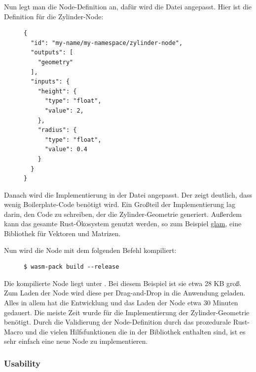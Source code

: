 \documentclass[ngerman]{article}
\begin{document}
Nun legt man die Node-Definition an, dafür wird die Datei  angepasst. Hier ist die Definition für die Zylinder-Node:


\begin{figure}[htbp]
  \begin{code}
    \begin{verbatim}
{
  "id": "my-name/my-namespace/zylinder-node",
  "outputs": [
    "geometry"
  ],
  "inputs": {
    "height": {
      "type": "float",
      "value": 2,
    },
    "radius": {
      "type": "float",
      "value": 0.4
    }
  }
}
    \end{verbatim}
  \end{code}
\end{figure}

Danach wird die Implementierung in der Datei  angepasst. Der  zeigt deutlich, dass wenig Boilerplate-Code benötigt wird. Ein Großteil der Implementierung lag darin, den Code zu schreiben, der die Zylinder-Geometrie generiert.  Außerdem kann das gesamte Rust-Ökosystem genutzt werden, so zum Beispiel \href{https://docs.rs/glam/latest/glam}{glam}, eine Bibliothek für Vektoren und Matrizen.

\pagebreak

Nun wird die Node mit dem folgenden Befehl kompiliert:

\begin{figure}[htbp]
  \begin{code}
    \begin{verbatim}
$ wasm-pack build --release
    \end{verbatim}
  \end{code}
\end{figure}

Die kompilierte Node liegt unter . Bei diesem Beispiel ist sie etwa 28 KB groß. Zum Laden der Node wird diese per Drag-and-Drop in die Anwendung geladen. 
\br
Alles in allem hat die Entwicklung und das Laden der Node etwa 30 Minuten gedauert. Die meiste Zeit wurde für die Implementierung der Zylinder-Geometrie benötigt. 
Durch die Validierung der Node-Definition durch das prozedurale  Rust-Macro und die vielen Hilfsfunktionen die in der  Bibliothek enthalten sind, ist es sehr einfach eine neue Node zu implementieren.

\subsubsection{Usability}
\end{document}
